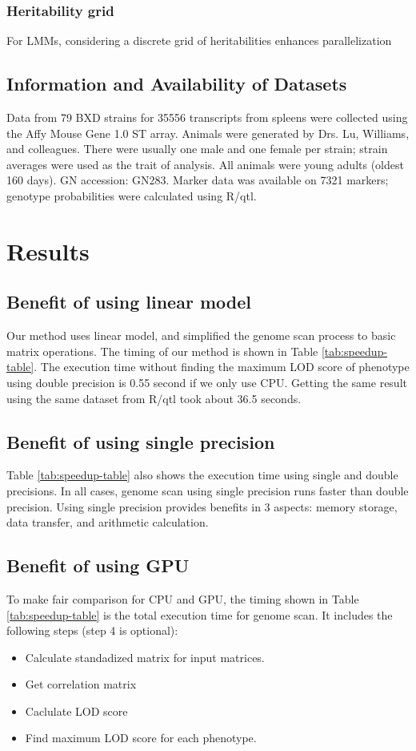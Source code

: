 \documentclass[9pt,twocolumn,twoside,lineno]{gsag3jnl}
\begin{document}
\subsubsection{Heritability grid}
For LMMs, considering a discrete grid of heritabilities enhances parallelization


\subsection{Information and Availability of Datasets}
Data from 79 BXD strains for 35556 transcripts from spleens were collected using the Affy Mouse Gene 1.0 ST array. Animals were generated by Drs. Lu, Williams, and colleagues. There were usually one male and one female per strain; strain averages were used as the trait of analysis. All animals were young adults (oldest 160 days). GN accession: GN283. Marker data was available on 7321 markers; genotype probabilities were calculated using R/qtl.


 
\section{Results}
\subsection{Benefit of using linear model}
Our method uses linear model, and simplified the genome scan process to basic matrix operations. 
The timing of our method is shown in Table \ref{tab:speedup-table}. 
The execution time without finding the maximum LOD score of phenotype using double precision is 0.55 second if we only use CPU. 
Getting the same result using the same dataset from R/qtl took about 36.5 seconds. 

\subsection{Benefit of using single precision}
Table \ref{tab:speedup-table} also shows the execution time using single and double precisions. 
In all cases, genome scan using single precision runs faster than double precision. 
Using single precision provides benefits in 3 aspects: memory storage, data transfer, and arithmetic calculation. 

\subsection{Benefit of using GPU}
To make fair comparison for CPU and GPU, the timing shown in Table \ref{tab:speedup-table} is the total execution time for genome scan. 
It includes the following steps (step 4 is optional):
\begin{itemize}
	\item Calculate standadized matrix for input matrices.
	\item Get correlation matrix
	\item Caclulate LOD score
	\item Find maximum LOD score for each phenotype. 
\end{itemize}
\end{document}
